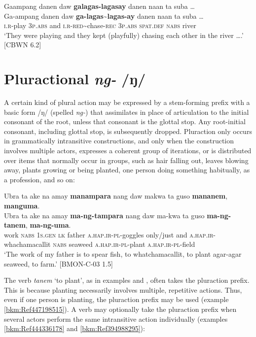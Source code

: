\newpage
\ea
Gaampang  danen  daw  \textbf{galagas-lagasay}  danen  naan  ta  suba … \\\smallskip
\gll Ga-ampang  danen  daw  \textbf{ga-lagas\sim{}lagas-ay}  danen  naan  ta  suba … \\
\textsc{i.r}-play  3\textsc{p.abs}  and  \textsc{i.r-red}\sim{}chase-\textsc{rec}  3\textsc{p.abs}  \textsc{spat.def}  \textsc{nabs}  river \\
\glt ‘They were playing and they kept (playfully) chasing each other in the river ….’ [CBWN 6.2]
\z
\section{Pluractional \textit{ng-} /ŋ/}
\label{sec:pluraction}

A certain kind of plural action may be expressed by a stem-forming prefix with a basic form /ŋ/ (spelled \textit{ng-}) that assimilates in place of articulation to the initial consonant of the root, unless that consonant is the glottal stop. Any root-initial consonant, including glottal stop, is subsequently dropped. Pluraction only occurs in grammatically intransitive constructions, and only when the construction involves multiple actors,  expresses a coherent group of iterations, or is distributed over items that normally occur in groups, such as hair falling out, leaves blowing away, plants growing or being planted, one person doing something habitually, as a profession, and so on:

\ea
\label{bkm:Ref447198515}
Ubra  ta  ake  na  amay  \textbf{manampara}  nang  daw makwa  ta  guso  \textbf{mananem},  \textbf{manguma}. \\\smallskip
\gll Ubra  ta  ake  na  amay  \textbf{ma-ng-tampara}  nang  daw ma-kwa  ta  guso  \textbf{ma-ng-tanem},  \textbf{ma-ng-uma}. \\
work  \textsc{nabs}  1\textsc{s.gen}  \textsc{lk}  father  \textsc{a.hap.ir-pl}-goggles  only/just  and
\textsc{a.hap.ir}-whachamacallit  \textsc{nabs}  seaweed  \textsc{a.hap.ir-pl}-plant  \textsc{a.hap.ir-pl}-field \\
\glt `The work of my father is to spear fish, to whatchamacallit, to plant agar-agar seaweed, to farm.’ [BMON-C-03 1.5]
\z

The verb \textit{tanem} ‘to plant’, as in examples  and , often takes the pluraction prefix. This is because planting necessarily involves multiple, repetitive actions. Thus, even if one person is planting, the pluraction prefix may be used (example \ref{bkm:Ref447198515}). A verb may optionally take the pluraction prefix when several actors perform the same intransitive action individually (examples \ref{bkm:Ref444336178} and \ref{bkm:Ref394988295}):


